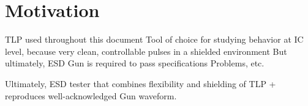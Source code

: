 \section{Motivation}

TLP used throughout this document
Tool of choice for studying behavior at IC level, because very clean, controllable pulses in a shielded environment
But ultimately, ESD Gun is required to pass specifications
Problems, etc.

Ultimately, ESD tester that combines flexibility and shielding of TLP + reproduces well-acknowledged Gun waveform.
